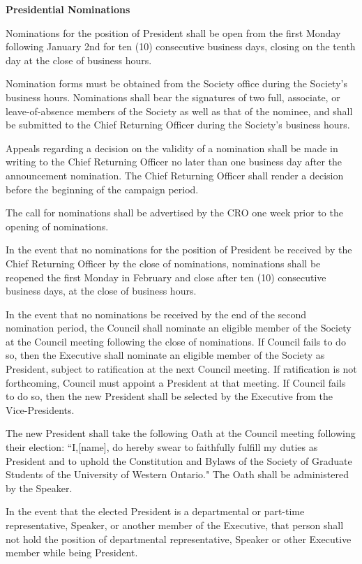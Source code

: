 \begin{longenum}[ label*=\thesection.\arabic*., align=left]
 \item \textbf{Presidential Nominations}
 \begin{longenum}[label*=\arabic*., align=left]
  \item  Nominations for the position of President shall be open from the first Monday following January 2nd for ten (10) consecutive business days, closing on the tenth day at the close of business hours. 
  \item  Nomination forms must be obtained from the Society office during the Society's business hours. Nominations shall bear the signatures of two full, associate, or leave-of-absence members of the Society as well as that of  the nominee, and shall be submitted to the Chief Returning Officer during the Society's business hours.
  \item Appeals regarding a decision on the validity of a nomination shall be made in writing to the Chief Returning Officer no later than one business day after the announcement nomination. The Chief Returning Officer shall render a decision before the beginning of the campaign period.
  \item The call for nominations shall be advertised by the CRO one week prior to the opening of nominations.
  \item In the event that no nominations for the position of President be received by the Chief Returning Officer by the close of nominations, nominations shall be reopened the first Monday in February and close after ten (10) consecutive business days, at the close of business hours.
  \item In the event that no nominations be received by the end of the second nomination period, the Council shall nominate an eligible member of the Society at the Council meeting following the close of nominations. If Council fails to do so, then the Executive shall nominate an eligible member of the Society as President, subject to ratification at the next Council meeting. If ratification is not forthcoming, Council must appoint a President at that meeting. If Council fails to do so, then the new President shall be selected by the Executive from the Vice-Presidents.
  \item The new President shall take the following Oath at the Council meeting following their election: ``I,[name], do hereby swear to faithfully fulfill my duties as President and to uphold the Constitution and Bylaws of the Society of Graduate Students of the University of Western Ontario." The Oath shall be administered by the Speaker.
  \item In the event that the elected President is a departmental or part-time representative, Speaker, or another member of the Executive, that person shall not hold the position of departmental representative, Speaker or other Executive member while being President.

\end{longenum}
\end{longenum}
